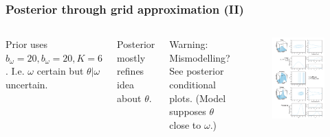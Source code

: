 \documentclass[usenames,dvipsnames,table]{beamer}
\begin{document}
\begin{frame}
\frametitle{Posterior through grid approximation (II)}
\begin{columns}[c]
Prior uses $b_\omega=20, b_\omega=20, K=6$. I.e. $\omega$ certain but $\theta|\omega$ uncertain.

\vspace{1em}
Posterior mostly refines idea about $\theta$.

\vspace{1em}
Warning: Mismodelling? See posterior conditional plots. (Model supposes $\theta$ close to $\omega$.)
\begin{figure}
\centering
\includegraphics[height=0.8\textheight]{img/fig9_3}
\end{figure}
\end{columns}
\end{frame}
\end{document}

